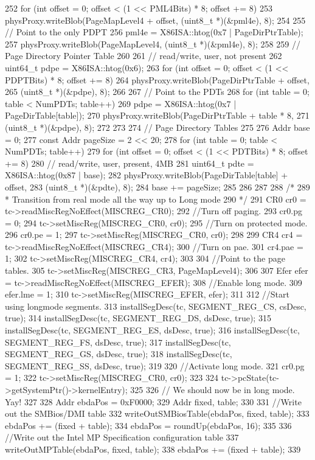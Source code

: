 \begin{DoxyCode}
{252     for (int offset = 0; offset < (1 << PML4Bits) * 8; offset += 8) {
253         physProxy.writeBlob(PageMapLevel4 + offset, (uint8_t *)(&pml4e), 8);
254     }
255     // Point to the only PDPT
256     pml4e = X86ISA::htog(0x7 | PageDirPtrTable);
257     physProxy.writeBlob(PageMapLevel4, (uint8_t *)(&pml4e), 8);
258 
259     // Page Directory Pointer Table
260 
261     // read/write, user, not present
262     uint64_t pdpe = X86ISA::htog(0x6);
263     for (int offset = 0; offset < (1 << PDPTBits) * 8; offset += 8) {
264         physProxy.writeBlob(PageDirPtrTable + offset,
265                             (uint8_t *)(&pdpe), 8);
266     }
267     // Point to the PDTs
268     for (int table = 0; table < NumPDTs; table++) {
269         pdpe = X86ISA::htog(0x7 | PageDirTable[table]);
270         physProxy.writeBlob(PageDirPtrTable + table * 8,
271                             (uint8_t *)(&pdpe), 8);
272     }
273 
274     // Page Directory Tables
275 
276     Addr base = 0;
277     const Addr pageSize = 2 << 20;
278     for (int table = 0; table < NumPDTs; table++) {
279         for (int offset = 0; offset < (1 << PDTBits) * 8; offset += 8) {
280             // read/write, user, present, 4MB
281             uint64_t pdte = X86ISA::htog(0x87 | base);
282             physProxy.writeBlob(PageDirTable[table] + offset,
283                                 (uint8_t *)(&pdte), 8);
284             base += pageSize;
285         }
286     }
287 
288     /*
289      * Transition from real mode all the way up to Long mode
290      */
291     CR0 cr0 = tc->readMiscRegNoEffect(MISCREG_CR0);
292     //Turn off paging.
293     cr0.pg = 0;
294     tc->setMiscReg(MISCREG_CR0, cr0);
295     //Turn on protected mode.
296     cr0.pe = 1;
297     tc->setMiscReg(MISCREG_CR0, cr0);
298 
299     CR4 cr4 = tc->readMiscRegNoEffect(MISCREG_CR4);
300     //Turn on pae.
301     cr4.pae = 1;
302     tc->setMiscReg(MISCREG_CR4, cr4);
303 
304     //Point to the page tables.
305     tc->setMiscReg(MISCREG_CR3, PageMapLevel4);
306 
307     Efer efer = tc->readMiscRegNoEffect(MISCREG_EFER);
308     //Enable long mode.
309     efer.lme = 1;
310     tc->setMiscReg(MISCREG_EFER, efer);
311 
312     //Start using longmode segments.
313     installSegDesc(tc, SEGMENT_REG_CS, csDesc, true);
314     installSegDesc(tc, SEGMENT_REG_DS, dsDesc, true);
315     installSegDesc(tc, SEGMENT_REG_ES, dsDesc, true);
316     installSegDesc(tc, SEGMENT_REG_FS, dsDesc, true);
317     installSegDesc(tc, SEGMENT_REG_GS, dsDesc, true);
318     installSegDesc(tc, SEGMENT_REG_SS, dsDesc, true);
319 
320     //Activate long mode.
321     cr0.pg = 1;
322     tc->setMiscReg(MISCREG_CR0, cr0);
323 
324     tc->pcState(tc->getSystemPtr()->kernelEntry);
325 
326     // We should now be in long mode. Yay!
327 
328     Addr ebdaPos = 0xF0000;
329     Addr fixed, table;
330 
331     //Write out the SMBios/DMI table
332     writeOutSMBiosTable(ebdaPos, fixed, table);
333     ebdaPos += (fixed + table);
334     ebdaPos = roundUp(ebdaPos, 16);
335 
336     //Write out the Intel MP Specification configuration table
337     writeOutMPTable(ebdaPos, fixed, table);
338     ebdaPos += (fixed + table);
339 }
\end{DoxyCode}
